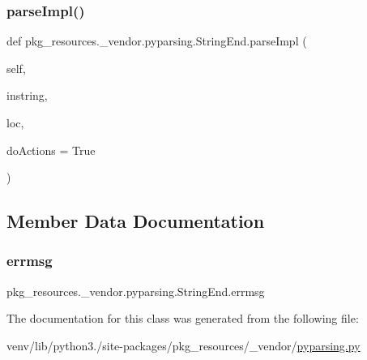 \subsubsection{\texorpdfstring{parse\+Impl()}{parseImpl()}}
{\footnotesize\ttfamily def pkg\+\_\+resources.\+\_\+vendor.\+pyparsing.\+String\+End.\+parse\+Impl (\begin{DoxyParamCaption}\item[{}]{self,  }\item[{}]{instring,  }\item[{}]{loc,  }\item[{}]{do\+Actions = {\ttfamily True} }\end{DoxyParamCaption})}



\subsection{Member Data Documentation}
\mbox{\label{classpkg__resources_1_1__vendor_1_1pyparsing_1_1StringEnd_aacf043cfe06aca93057d291fb7bc39ec}} 
\subsubsection{\texorpdfstring{errmsg}{errmsg}}
{\footnotesize\ttfamily pkg\+\_\+resources.\+\_\+vendor.\+pyparsing.\+String\+End.\+errmsg}



The documentation for this class was generated from the following file\+:\begin{DoxyCompactItemize}
\item 
venv/lib/python3./site-\/packages/pkg\+\_\+resources/\+\_\+vendor/\hyperlink{pkg__resources_2__vendor_2pyparsing_8py}{pyparsing.\+py}\end{DoxyCompactItemize}
